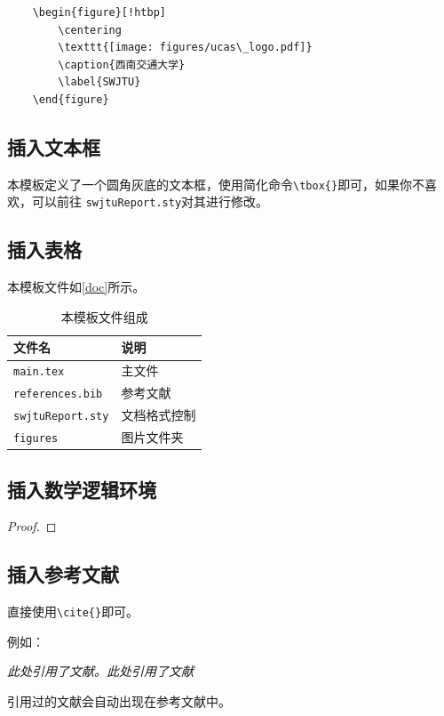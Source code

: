 \begin{verbatim}
    \begin{figure}[!htbp]
        \centering
        \texttt{[image: figures/ucas\_logo.pdf]}
        \caption{西南交通大学}
        \label{SWJTU}
    \end{figure}
\end{verbatim}

\subsection{插入文本框}
本模板定义了一个圆角灰底的文本框，使用简化命令\verb|\tbox{}|即可，如果你不喜欢，可以前往 \texttt{swjtuReport.sty}对其进行修改。


\subsection{插入表格}
本模板文件如\autoref{doc}所示。
\begin{table}[!htbp]
    \centering
    \begin{tabular}{l|l}
    \hline
        文件名 & 说明 \\
        \hline
        \texttt{main.tex}  & 主文件 \\
        \texttt{references.bib} & 参考文献 \\
        \texttt{swjtuReport.sty}  & 文档格式控制\\
        \texttt{figures}  & 图片文件夹 \\
        \hline
    \end{tabular}
    \caption{本模板文件组成}
    \label{doc}
\end{table}

\subsection{插入数学逻辑环境}

\begin{Theorem}   %
\end{Theorem}

\begin{Lemma}   %
\end{Lemma}

\begin{Corollary}   %
\end{Corollary}

\begin{Proposition}   %
\end{Proposition}

\begin{Definition}   %
\end{Definition}

\begin{Example}   %
\end{Example}

\begin{proof}   %
\end{proof}

\subsection{插入参考文献}
直接使用\verb|\cite{}|即可。

例如：

   \textit{ 此处引用了文献\cite{0Isaac}。此处引用了文献\cite{2016The}}

引用过的文献会自动出现在参考文献中。